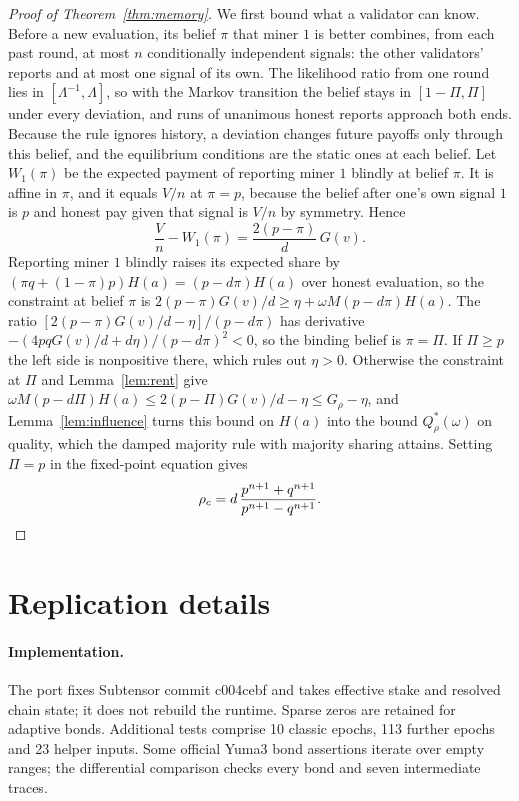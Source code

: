 \documentclass[sigconf,anonymous,review]{acmart}
\numberwithin{equation}{section}
\begin{document}
\begin{proof}[Proof of Theorem~\ref{thm:memory}]
We first bound what a validator can know. Before a new evaluation, its belief
$\pi$ that miner $1$ is better combines, from each past round, at most $n$
conditionally independent signals:
the other validators' reports and at most one signal of its own. The likelihood
ratio from one round lies in $[\Lambda^{-1},\Lambda]$, so with the Markov
transition the belief stays in $[1-\Pi,\Pi]$ under every deviation, and runs of
unanimous honest reports approach both ends. Because the rule ignores history,
a deviation changes future payoffs only through this belief, and the
equilibrium conditions are the static ones at each belief. Let $W_1(\pi)$ be the
expected payment of reporting miner $1$ blindly at belief $\pi$. It is affine
in $\pi$, and it equals $V/n$ at $\pi=p$, because the belief after one's own
signal $1$ is $p$ and honest pay given that signal is $V/n$ by symmetry. Hence
\[
\frac Vn-W_1(\pi)=\frac{2(p-\pi)}{d}\,G(v).
\]
Reporting miner $1$ blindly raises its expected share by
$(\pi q+(1-\pi)p)H(a)=(p-d\pi)H(a)$ over honest evaluation, so the constraint at
belief $\pi$ is $2(p-\pi)G(v)/d\ge\eta+\omega M(p-d\pi)H(a)$. The ratio
$[2(p-\pi)G(v)/d-\eta]/(p-d\pi)$ has derivative
$-(4pqG(v)/d+d\eta)/(p-d\pi)^2<0$, so the binding belief is $\pi=\Pi$. If
$\Pi\ge p$ the left side is nonpositive there, which rules out $\eta>0$.
Otherwise the constraint at $\Pi$ and Lemma~\ref{lem:rent} give
$\omega M(p-d\Pi)H(a)\le2(p-\Pi)G(v)/d-\eta\le G_\rho-\eta$, and
Lemma~\ref{lem:influence} turns this bound on $H(a)$ into the bound
$Q^*_\rho(\omega)$ on quality, which the damped majority rule with majority
sharing attains. Setting $\Pi=p$ in the fixed-point equation gives
\[
\rho_c=d\,\frac{p^{n+1}+q^{n+1}}{p^{n+1}-q^{n+1}}.\qedhere
\]
\end{proof}

\section{Replication details}
\label{app:replica}

\paragraph{Implementation.} The port fixes Subtensor commit c004cebf and
takes effective stake and resolved chain state; it does not rebuild the
runtime. Sparse zeros are retained for adaptive bonds. Additional tests
comprise 10 classic epochs, 113 further epochs and 23 helper inputs.
Some official Yuma3 bond assertions iterate over empty ranges; the
differential comparison checks every bond and seven intermediate traces.
\end{document}
